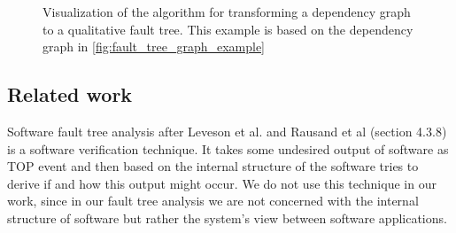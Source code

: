 \begin{figure}[p]
  \centering
  \caption{Visualization of the algorithm for transforming a dependency graph to a qualitative fault tree. This example is based on the dependency graph in \autoref{fig:fault_tree_graph_example}}
  \label{fig:fault_tree_graph_example_algorithm}
\end{figure}


\subsection{Related work}

Software fault tree analysis after Leveson et al. \cite{LevesonSoftwareFaultTrees} and Rausand et al \cite{SysReliabilityTheory} (section 4.3.8) is a software verification technique. It takes some undesired output of software as TOP event and then based on the internal structure of the software tries to derive if and how this output might occur. We do not use this technique in our work, since in our fault tree analysis we are not concerned with the internal structure of software but rather the system's view between software applications.

